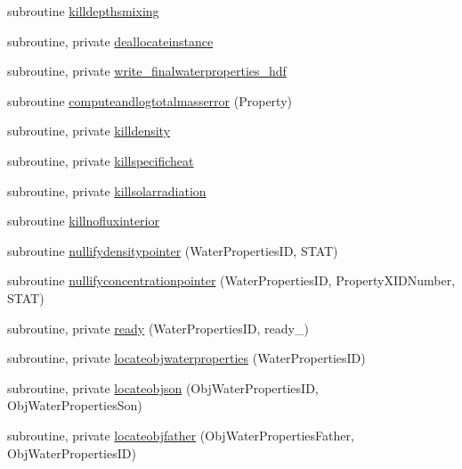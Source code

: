 \begin{DoxyCompactItemize}
\item 
subroutine \mbox{\hyperlink{namespacemodulewaterproperties_a75dba19ef36b16b901b8d7bab39b00bc}{killdepthsmixing}}
\item 
subroutine, private \mbox{\hyperlink{namespacemodulewaterproperties_afcf00b3b04c6e13ebfe955c7074bc924}{deallocateinstance}}
\item 
subroutine, private \mbox{\hyperlink{namespacemodulewaterproperties_a2893cea8ca427b1290aeb65593659aa0}{write\+\_\+finalwaterproperties\+\_\+hdf}}
\item 
subroutine \mbox{\hyperlink{namespacemodulewaterproperties_af1b9165b0e72747e4478868c7e5eff00}{computeandlogtotalmasserror}} (Property)
\item 
subroutine, private \mbox{\hyperlink{namespacemodulewaterproperties_aa8cc31da812d7fc89d0dcc1d1fafac2f}{killdensity}}
\item 
subroutine, private \mbox{\hyperlink{namespacemodulewaterproperties_a801b2f175ad723ebc00e21ea2c6616cf}{killspecificheat}}
\item 
subroutine, private \mbox{\hyperlink{namespacemodulewaterproperties_a656b771bc1432d56a5e5701857e3c914}{killsolarradiation}}
\item 
subroutine \mbox{\hyperlink{namespacemodulewaterproperties_ad2bfc0be1f4f81fc71b67a511411698e}{killnofluxinterior}}
\item 
subroutine \mbox{\hyperlink{namespacemodulewaterproperties_a36c17f1a6e6a657a207beb63be984d2a}{nullifydensitypointer}} (Water\+Properties\+ID, S\+T\+AT)
\item 
subroutine \mbox{\hyperlink{namespacemodulewaterproperties_aded20695e00a7e2a2792781914847187}{nullifyconcentrationpointer}} (Water\+Properties\+ID, Property\+X\+I\+D\+Number, S\+T\+AT)
\item 
subroutine, private \mbox{\hyperlink{namespacemodulewaterproperties_ad54774dedce486739249cb10b4de21e2}{ready}} (Water\+Properties\+ID, ready\+\_\+)
\item 
subroutine, private \mbox{\hyperlink{namespacemodulewaterproperties_ae4516d6c7f3687b0293515314b0ade90}{locateobjwaterproperties}} (Water\+Properties\+ID)
\item 
subroutine, private \mbox{\hyperlink{namespacemodulewaterproperties_aa9cca4cb017da12a540fca143edcc19f}{locateobjson}} (Obj\+Water\+Properties\+ID, Obj\+Water\+Properties\+Son)
\item 
subroutine, private \mbox{\hyperlink{namespacemodulewaterproperties_abe99a26b781f6af9708e4db390fcdcba}{locateobjfather}} (Obj\+Water\+Properties\+Father, Obj\+Water\+Properties\+ID)

\end{DoxyCompactItemize}
